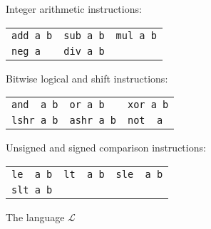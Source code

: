 \begin{figure}
{\small
\begin{center}
\setlength{\tabcolsep}{16pt}
Integer arithmetic instructions:

\begin{tabular}{lll}
 \verb|add a b| & \verb|sub a b| & \verb|mul a b| \\
 \verb|neg a| & \verb|div a b|  & 
\end{tabular}

\medskip

Bitwise logical and shift instructions:

\begin{tabular}{lll}
 \verb|and  a b| & \verb|or a b| & \verb|xor a b| \\
 \verb|lshr a b| & \verb|ashr a b| & \verb|not  a| 
\end{tabular}

\medskip

Unsigned and signed comparison instructions:

\begin{tabular}{lll}
 \verb|le  a b| & \verb|lt  a b| & \verb|sle  a b| \\
 \verb|slt a b| & &
\end{tabular}
\end{center}
}
 \caption{The language $\mathcal{L}$}
 \label{fig:l-language}
\end{figure}





  

